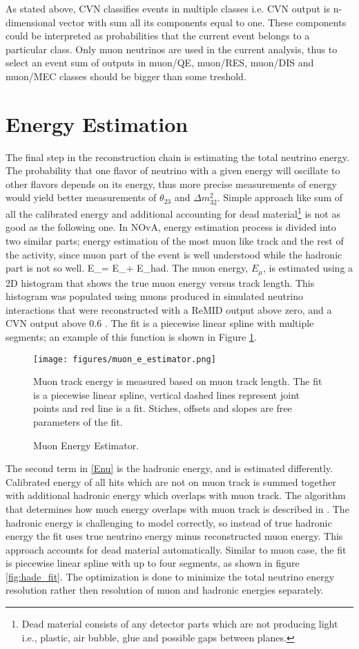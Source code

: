As stated above, CVN classifies events in multiple classes i.e. CVN output is n-dimensional vector with sum all its 
components equal to one. These components could be interpreted as probabilities that the current event belongs 
to a particular class. Only muon neutrinos are used in the current analysis, thus to select an event sum of outputs 
in muon/QE, muon/RES, muon/DIS and muon/MEC classes should be bigger than some treshold.

\section{Energy Estimation} \label{energy_est_cont}
The final step in the reconstruction chain is estimating the total neutrino energy. The probability that one
flavor of neutrino with a given energy will oscillate to other flavors depends on its energy, thus more
precise measurements of energy would yield better measurements of $\theta_{23}$ and $\Delta m_{32}^2$.
Simple approach like sum of all the calibrated energy and additional accounting for dead 
material\footnote{Dead material consists of any detector parts which are not producing light i.e., plastic, air 
bubble, glue and possible gaps between planes.} is not as good as the following one. In NOvA, energy estimation 
process is divided into two similar parts; energy estimation of the most muon like track and the rest of the 
activity, since muon part of the event is well understood while the hadronic part is not so well.
\be
E_\nu = E_\mu + E_{had}.
\ee 
The muon energy, $E_{\mu}$, is estimated using a 2D histogram that shows the true muon energy versus track length.
This histogram was populated using muons produced in simulated neutrino interactions that were reconstructed with
a ReMID output above zero, and a CVN output above 0.6 \cite{energy_technote}. The fit is a piecewise linear spline
with multiple segments; an example of this function is shown in Figure \ref{fig:mue_fit}.
\begin{figure}[t]
\texttt{[image: figures/muon\_e\_estimator.png]}
\centering
\caption{Muon Energy Estimator.}
{Muon track energy is measured based on muon track length. The fit is a piecewise linear spline, vertical dashed
lines represent joint points and red line is a fit. Stiches, offsets and slopes are free parameters of the fit.}
\label{fig:mue_fit}
\end{figure}

The second term in \ref{Enu} is the hadronic energy, and is estimated differently. Calibrated energy of all hits 
which are not on muon track is summed together with additional hadronic energy which overlaps with muon track. 
The algorithm that determines how much energy overlaps with muon track is described in \cite{Kanika}. The hadronic
energy is challenging to model correctly, so instead of true hadronic energy the fit uses true neutrino energy minus
reconstructed muon energy. This approach accounts for dead material automatically. Similar to muon case, the fit 
is piecewise linear spline with up to four segments, as shown in figure \ref{fig:hade_fit}. The optimization is done
to minimize the total neutrino energy resolution rather then resolution of muon and hadronic energies separately. 

